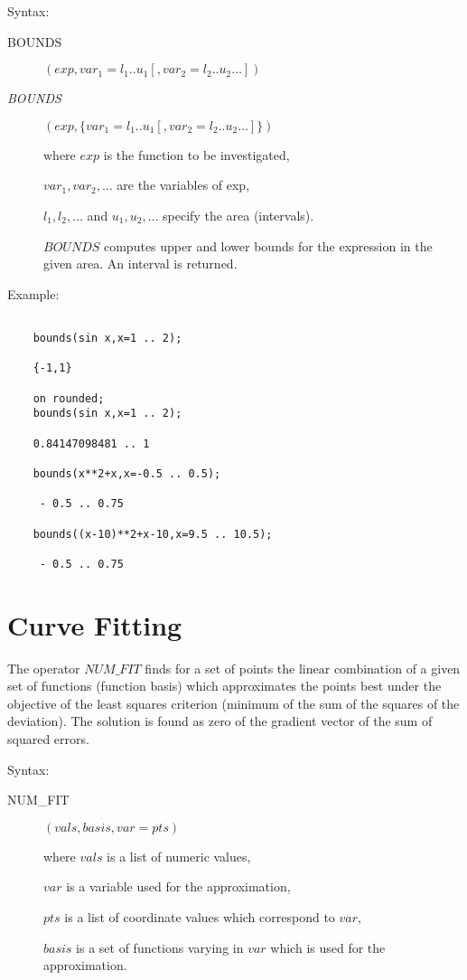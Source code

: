 Syntax:


\begin{description}
\item[BOUNDS]$(exp,var_1=l_1 .. u_1 [,var_2=l_2 .. u_2 \ldots])$
 
\item[{\it BOUNDS}]$(exp,\{var_1=l_1 .. u_1 [,var_2=l_2 .. u_2 \ldots]\})$

where $exp$ is the function to be investigated,

$var_1, var_2 , \ldots$ are the variables of exp,

$l_1, l_2 , \ldots$  and  $u_1, u_2 , \ldots$ specify the area (intervals).

$BOUNDS$ computes upper and lower bounds for the expression in the
given area. An interval is returned.
 
\end{description}
 
Example:
 
\begin{verbatim}
 
    bounds(sin x,x=1 .. 2);

    {-1,1}

    on rounded;
    bounds(sin x,x=1 .. 2);
 
    0.84147098481 .. 1
 
    bounds(x**2+x,x=-0.5 .. 0.5);
 
     - 0.5 .. 0.75
 
    bounds((x-10)**2+x-10,x=9.5 .. 10.5);

     - 0.5 .. 0.75

\end{verbatim} 
    

\section{Curve Fitting}

The operator $NUM\_FIT$ finds for a set of
points the linear combination of a given set of
functions (function basis) which approximates the
points best under the objective of the least squares
criterion (minimum of the sum of the squares of the deviation).
The solution is found as zero of the
gradient vector of the sum of squared errors.

Syntax:

\begin{description}
\item[NUM\_FIT] $(vals,basis,var=pts)$
 
where $vals$ is a list of numeric values,
 
$var$ is a variable used for the approximation,
 
$pts$ is a list of coordinate values which correspond to $var$,
 
$basis$ is a set of functions varying in $var$ which is used
  for the approximation.
 
\end{description}

